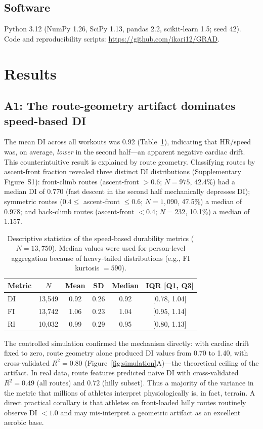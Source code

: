 \documentclass[12pt]{article}
\begin{document}
\subsection{Software}
Python 3.12 (NumPy 1.26, SciPy 1.13, pandas 2.2, scikit-learn 1.5; seed
42). Code and reproducibility scripts:
\url{https://github.com/ikari12/GRAD}.

\section{Results}
\subsection{A1: The route-geometry artifact dominates speed-based DI}
The mean DI across all workouts was 0.92 (Table~\ref{tab:descriptive}),
indicating that HR/speed was, on average, \emph{lower} in the second
half---an apparent negative cardiac drift. This counterintuitive result
is explained by route geometry. Classifying routes by ascent-front
fraction revealed three distinct DI distributions (Supplementary
Figure~S1): front-climb routes (ascent-front $>0.6$; $N=975$, 42.4\%) had
a median DI of 0.770 (fast descent in the second half mechanically
depresses DI); symmetric routes ($0.4\leq$ ascent-front $\leq0.6$;
$N=1{,}090$, 47.5\%) a median of 0.978; and back-climb routes
(ascent-front $<0.4$; $N=232$, 10.1\%) a median of 1.157.

\begin{table}[t]
\centering
\caption{Descriptive statistics of the speed-based durability metrics
($N = 13{,}750$). Median values were used for person-level aggregation
because of heavy-tailed distributions (e.g., FI kurtosis $= 590$).}
\label{tab:descriptive}
\begin{tabular}{@{}lccccc@{}}
\toprule
Metric & $N$ & Mean & SD & Median & IQR [Q1, Q3] \\
\midrule
DI & 13,549 & 0.92 & 0.26 & 0.92 & [0.78, 1.04] \\
FI & 13,742 & 1.06 & 0.23 & 1.04 & [0.95, 1.14] \\
RI & 10,032 & 0.99 & 0.29 & 0.95 & [0.80, 1.13] \\
\bottomrule
\end{tabular}
\end{table}

The controlled simulation confirmed the mechanism directly: with cardiac
drift fixed to zero, route geometry alone produced DI values from 0.70 to
1.40, with cross-validated $R^2 = 0.80$
(Figure~\ref{fig:simulation}A)---the theoretical ceiling of the artifact.
In real data, route features predicted naive DI with cross-validated
$R^2 = 0.49$ (all routes) and $0.72$ (hilly subset). Thus a majority of
the variance in the metric that millions of athletes interpret
physiologically is, in fact, terrain. A direct practical corollary is that
athletes on front-loaded hilly routes routinely observe DI $<1.0$ and may
mis-interpret a geometric artifact as an excellent aerobic base.
\end{document}
